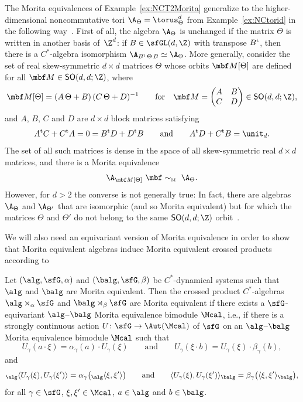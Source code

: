 \begin{Example}
\label{ex:NCTdMorita}
The Morita equivalences of Example~\ref{ex:NCT2Morita} generalize to
the higher-dimensional noncommutative tori $\A_\Theta=\torus^d_\Theta$
from Example~\ref{ex:NCtorid} in the following
way~\cite{Rieffel1998}. First of all, the algebra $\A_\Theta$ is
unchanged if the matrix $\Theta$ is written in another basis of~$\Z^d$: if $B\in\sfGL(d,\Z)$ with transpose $B^{\rm t}$, then there is
a $C^*$-algebra isomorphism
$\A_{B^{\rm t}\,\Theta\,B}\simeq\A_\Theta$. More generally, consider the set of real
skew-symmetric $d{\times}d$ matrices $\Theta$ whose orbits
$\mbf M[\Theta]$ are defined for all $\mbf M\in{\sf SO}(d,d;\Z)$, where
\[
\mbf M[\Theta] = (A\,\Theta+B)\,(C\,\Theta+D)^{-1} \qquad \mbox{for} \quad
\mbf M=\left(\begin{matrix} A & B \\ C & D \end{matrix}\right) \in
{\sf SO}(d,d;\Z) ,
\]
and $A$, $B$, $C$ and $D$ are $d{\times}d$ block matrices satisfying
\[
A^{\rm t} C+C^{\rm t} A = 0 = B^{\rm t} D+D^{\rm t} B \qquad
\mbox{and} \qquad A^{\rm t} D+C^{\rm t} B=\unit_d .
\]
The set of all such matrices is dense in the space of all
skew-symmetric real $d{\times}d$ matrices, and there is a Morita
equivalence
\[
\A_{\mbf M[\Theta]} \ \mbf\sim_{\text{\tiny M}} \ \A_\Theta .
\]
However, for $d>2$ the converse is not generally true: In fact, there
are algebras $\A_\Theta$ and $\A_{\Theta'}$ that are isomorphic (and
so Morita equivalent) but for which the matrices $\Theta$ and
$\Theta'$ do not belong to the same ${\sf SO}(d,d;\Z)$
orbit~\cite{Rieffel1998}.
\end{Example}

We will also need an equivariant version of Morita equivalence in
order to show that Morita equivalent algebras induce Morita
equivalent crossed products according
to~\cite[Section~5.4]{Echterhoff2017}
\begin{Theorem}\label{equivMorita}
Let $(\alg,\sfG, \alpha)$ and $(\balg,\sfG, \beta)$ be
$C^*$-dynamical systems such that
$\alg$ and $\balg$ are Morita equivalent. Then the crossed product $C^*$-algebras
$\alg\rtimes_\alpha \sfG$ and $\balg\rtimes_\beta \sfG$ are Morita equivalent if
there exists a $\sfG$-equivariant $\alg$--$\balg$ Morita equivalence bimodule $\Mcal$,
i.e., if there is a strongly continuous action $U\colon \sfG\to \Aut(\Mcal)$ of $\sfG$ on an
$\alg$--$\balg$ Morita equivalence bimodule $\Mcal$ such that
\[
U_\gamma(a\cdot \xi)=\alpha_\gamma(a)\cdot
U_\gamma(\xi) \qquad \mbox{and} \qquad U_\gamma(\xi\cdot b)=U_\gamma(\xi)\cdot
\beta_\gamma(b) ,
\]
and
\[
{}_{\alg}\langle U_\gamma(\xi),U_\gamma(\xi')\rangle=\alpha_\gamma\big({}_\alg\langle
\xi,\xi'\rangle\big) \qquad \mbox{and} \qquad \langle
U_\gamma(\xi),U_\gamma(\xi')\rangle_\balg =\beta_\gamma\big(\langle
\xi,\xi'\rangle_\balg\big) ,
\]
for
all $\gamma\in \sfG$, $\xi,\xi'\in \Mcal$, $a\in \alg$ and $b\in \balg$.
\end{Theorem}

